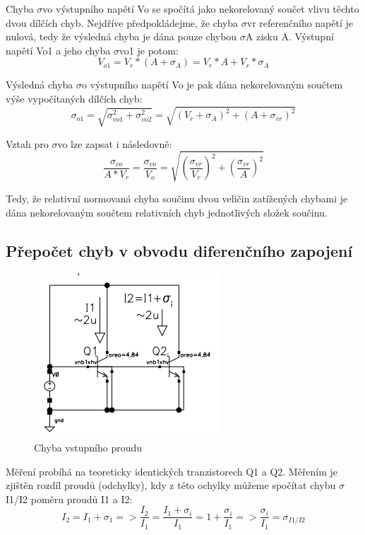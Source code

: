 Chyba $\sigma$vo výstupního napětí Vo se spočítá jako nekorelovaný součet vlivu těchto dvou dílčích chyb. Nejdříve předpokládejme, že chyba $\sigma$vr referenčního napětí je nulová, tedy že výsledná chyba je dána pouze chybou $\sigma$A zisku A. Výstupní napětí Vo1 a jeho chyba $\sigma$vo1 je potom:
\begin{equation}
V_{o1} = V_{r}*(A+\sigma_{A})=V_{r}*A+V_{r}*\sigma_{A}
\end{equation}

Výsledná chyba $\sigma$o výstupního napětí Vo je pak dána nekorelovaným součtem výše vypočítaných dílčích chyb:
\begin{equation}
\sigma_{o1} = \sqrt{\sigma_{vo1}^{2}+\sigma_{vo2}^{2}}=\sqrt{(V_{r}+\sigma_{A})^2+(A+\sigma_{vr})^2}
\end{equation}

Vztah pro $\sigma$vo lze zapsat i následovně:
\begin{equation}
\frac{\sigma_{vo}}{A*V_{r}}=\frac{\sigma_{vo}}{V_{o}}=\sqrt{(\frac{\sigma_{vr}}{V_{r}})^2+(\frac{\sigma_{vr}}{A})^2}
\end{equation}

Tedy, že relativní normovaná chyba součinu dvou veličin zatížených chybami je dána nekorelovaným součtem relativních chyb jednotlivých složek součinu.

\subsection{Přepočet chyb v obvodu diferenčního zapojení}

\begin{figure}[h]
   \begin{center}
     \includegraphics[scale=1]{images/Prepocet.png}
   \end{center}
   \caption{Chyba vstupního proudu}
\end{figure}

Měření probíhá na teoreticky identických tranzistorech Q1 a Q2. Měřením je zjištěn rozdíl proudů (odchylky), kdy z této ochylky můžeme spočítat chybu $\sigma$I1/I2 poměru proudů I1 a I2:
\begin{equation}
I_{2} = I_{1}+\sigma_{1} => \frac{I_{2}}{I_{1}} = \frac{I_{1}+\sigma_{i}}{I_{1}}=1+\frac{\sigma_{i}}{I_{1}} => \frac{\sigma_{i}}{I_{1}} = \sigma_{I1/I2}
\end{equation}

